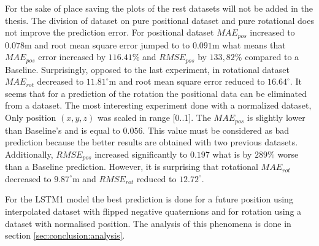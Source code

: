 For the sake of place saving the plots of the rest datasets will not be added in the thesis. The division of dataset on pure positional dataset and pure rotational does not improve the prediction error. For positional dataset $MAE_{pos}$ increased to $0.078$m and root mean square error jumped to to $0.091$m what means that $MAE_{pos}$ error increased by $116.41\%$ and $RMSE_{pos}$ by $133,82\%$ compared to a Baseline. Surprisingly, opposed to the last experiment, in rotational dataset $MAE_{rot}$ decreased to $11.81^{\circ}$m and root mean square error reduced to $16.64^{\circ}$. It seems that for a prediction of the rotation the positional data can be eliminated from a dataset. The most interesting experiment done with a normalized dataset, Only position $(x, y, z)$ was scaled in range [0..1]. The $MAE_{pos}$ is slightly lower than Baseline's and is equal to $0.056$. This value must be considered as bad prediction because the better results are obtained with two previous datasets. Additionally, $RMSE_{pos}$ increased significantly to $0.197$ what is by $289\%$ worse than a Baseline prediction. However, it is surprising that rotational $MAE_{rot}$ decreased to $9.87^{\circ}$m and $RMSE_{rot}$ reduced to  $12.72^{\circ}$. 

For the LSTM1 model the best prediction is done for a future position using interpolated dataset with flipped negative quaternions and for rotation using a dataset with normalised position. The analysis of this phenomena is done in section \ref{sec:conclusion:analysis}.

